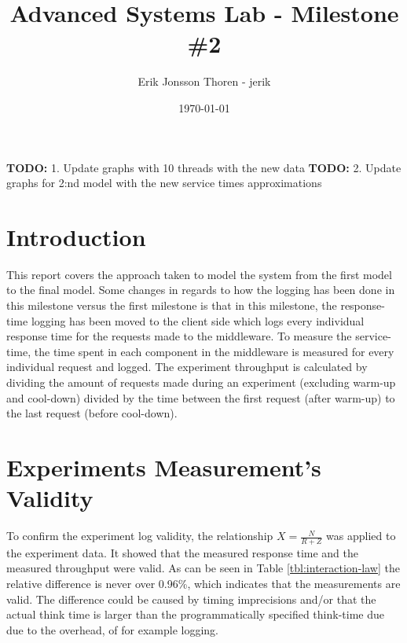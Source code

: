 \documentclass[a4paper, 11pt]{article}
\title{Advanced Systems Lab - Milestone \#2}
\author{Erik Jonsson Thoren - jerik\\}
\date{\today}
\newcommand{\TODO}[1]{\textbf{TODO:} #1}
\begin{document}
\maketitle
\tableofcontents
\newpage

\TODO{1. Update graphs with 10 threads with the new data}
\TODO{2. Update graphs for 2:nd model with the new service times approximations}

\section{Introduction}
This report covers the approach taken to model the system from the first model to the final model. Some changes in regards to how the logging has been done in this milestone versus the first milestone is that in this milestone, the response-time logging has been moved to the client side which logs every individual response time for the requests made to the middleware. To measure the service-time, the time spent in each component in the middleware is measured for every individual request and logged. The experiment throughput is calculated by dividing the amount of requests made during an experiment (excluding warm-up and cool-down) divided by the time between the first request (after warm-up) to the last request (before cool-down).

\section{Experiments Measurement's Validity}
	To confirm the experiment log validity, the relationship $X=\frac{N}{R+Z}$ was applied to the experiment data. It showed that the measured response time and the measured throughput were valid. As can be seen in Table \ref{tbl:interaction-law} the relative difference is never over 0.96\%, which indicates that the measurements are valid. The difference could be caused by timing imprecisions and/or that the actual think time is larger than the programmatically specified think-time due due to the overhead, of for example logging.
\end{document}
